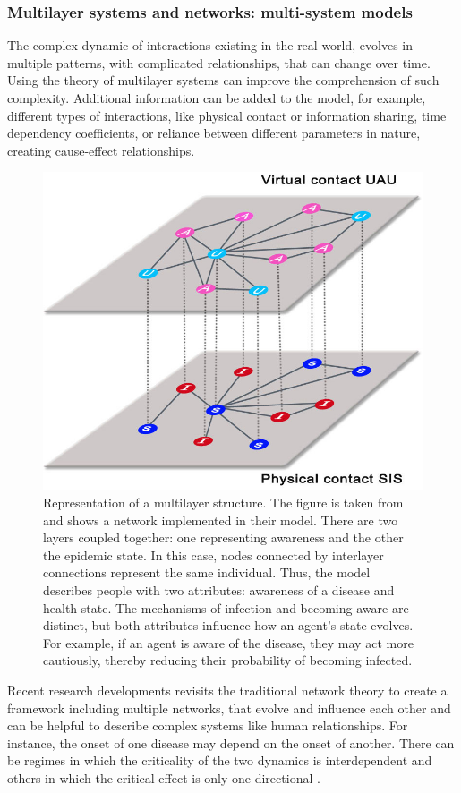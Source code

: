\subsubsection{Multilayer systems and networks: multi-system models} 
The complex dynamic of interactions existing in the real world, evolves in multiple patterns, with complicated relationships, that can change over time. Using the theory of multilayer systems can improve the comprehension of such complexity. Additional information can be added to the model, for example, different types of interactions, like physical contact or information sharing, time dependency coefficients, or reliance between different parameters in nature, creating cause-effect relationships.
\begin{figure}[ht]
	\centering
	\includegraphics[width=0.5\linewidth]{0_introduction/images_introduction/multi_layer}
	\caption[Multi-layer network]{Representation of a multilayer structure. The figure is taken from \cite{Granell2013} and shows a network implemented in their model. There are two layers coupled together: one representing awareness and the other the epidemic state. In this case, nodes connected by interlayer connections represent the same individual. Thus, the model describes people with two attributes: awareness of a disease and health state. The mechanisms of infection and becoming aware are distinct, but both attributes influence how an agent's state evolves. For example, if an agent is aware of the disease, they may act more cautiously, thereby reducing their probability of becoming infected.}
	\label{fig:multilayer}
\end{figure} 
Recent research developments revisits the traditional network theory to create a framework including multiple networks, that evolve and influence each other \cite{DeDomenico2016, Krickel_2023} and can be helpful to describe complex systems like human relationships. For instance, the onset of one disease may depend on the onset of another. There can be regimes in which the criticality of the two dynamics is interdependent and others in which the critical effect is only one-directional \cite{DeDomenico2016}. 
